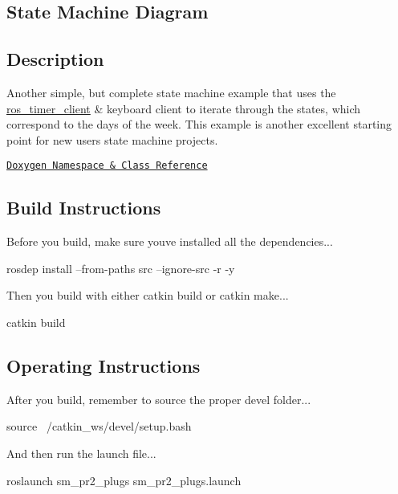 \subsection*{State Machine Diagram}



\subsection*{Description}

Another simple, but complete state machine example that uses the \hyperlink{namespaceros__timer__client}{ros\+\_\+timer\+\_\+client} \& keyboard client to iterate through the states, which correspond to the days of the week. This example is another excellent starting point for new users state machine projects.~\newline


\href{https://reelrbtx.github.io/SMACC_Documentation/master/html/namespacesm__pr2__plugs.html}{\tt Doxygen Namespace \& Class Reference}

\subsection*{Build Instructions}

Before you build, make sure you\textquotesingle{}ve installed all the dependencies...


\begin{DoxyCode}
rosdep install --from-paths src --ignore-src -r -y 
\end{DoxyCode}


Then you build with either catkin build or catkin make...


\begin{DoxyCode}
catkin build
\end{DoxyCode}


\subsection*{Operating Instructions}

After you build, remember to source the proper devel folder...


\begin{DoxyCode}
source ~/catkin\_ws/devel/setup.bash
\end{DoxyCode}


And then run the launch file...


\begin{DoxyCode}
roslaunch sm\_pr2\_plugs sm\_pr2\_plugs.launch
\end{DoxyCode}


